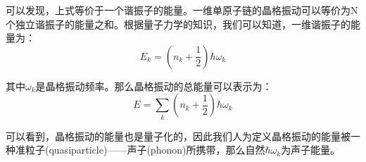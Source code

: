 \documentclass{ctexart}
\begin{document}
            可以发现，上式等价于一个谐振子的能量。一维单原子链的晶格振动可以等价为N个独立谐振子的能量之和。根据量子力学的知识，我们可以知道，一维谐振子的能量为：
            \begin{equation}
                E_k=(n_k+\frac{1}{2})\hbar\omega_k
            \end{equation}
            
            其中$\omega_k$是晶格振动频率。那么晶格振动的总能量可以表示为：
            \begin{equation}
                E=\sum_k (n_k+\frac{1}{2})\hbar\omega_k
            \end{equation}
            
            可以看到，晶格振动的能量也是量子化的，因此我们人为定义晶格振动的能量被一种准粒子(quasiparticle)——声子(phonon)所携带，那么自然$\hbar\omega_k$为声子能量。
            
\end{document}
